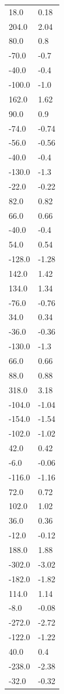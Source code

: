 \begin{longtable}{ll}
18.0 & 0.18 \\
204.0 & 2.04 \\
80.0 & 0.8 \\
-70.0 & -0.7 \\
-40.0 & -0.4 \\
-100.0 & -1.0 \\
162.0 & 1.62 \\
90.0 & 0.9 \\
-74.0 & -0.74 \\
-56.0 & -0.56 \\
-40.0 & -0.4 \\
-130.0 & -1.3 \\
-22.0 & -0.22 \\
82.0 & 0.82 \\
66.0 & 0.66 \\
-40.0 & -0.4 \\
54.0 & 0.54 \\
-128.0 & -1.28 \\
142.0 & 1.42 \\
134.0 & 1.34 \\
-76.0 & -0.76 \\
34.0 & 0.34 \\
-36.0 & -0.36 \\
-130.0 & -1.3 \\
66.0 & 0.66 \\
88.0 & 0.88 \\
318.0 & 3.18 \\
-104.0 & -1.04 \\
-154.0 & -1.54 \\
-102.0 & -1.02 \\
42.0 & 0.42 \\
-6.0 & -0.06 \\
-116.0 & -1.16 \\
72.0 & 0.72 \\
102.0 & 1.02 \\
36.0 & 0.36 \\
-12.0 & -0.12 \\
188.0 & 1.88 \\
-302.0 & -3.02 \\
-182.0 & -1.82 \\
114.0 & 1.14 \\
-8.0 & -0.08 \\
-272.0 & -2.72 \\
-122.0 & -1.22 \\
40.0 & 0.4 \\
-238.0 & -2.38 \\
-32.0 & -0.32 \\

\end{longtable}
